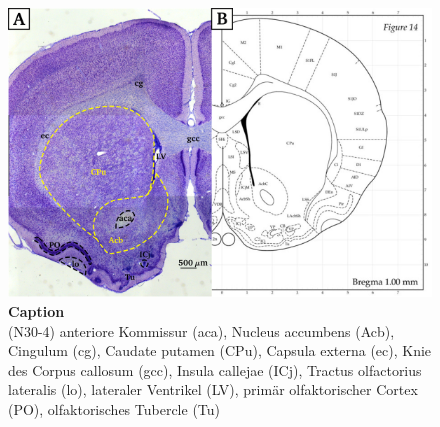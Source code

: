 \documentclass[12pt,a4paper,pdftex]{article}
\begin{document}
\begin{figure}[H]
    \centering
    \includegraphics{pictures/Basalganglia/Nucleus_acumbens.png}
    \caption[Caption]{\textbf{Caption}\\
    (N30-4)
    anteriore Kommissur (aca), Nucleus accumbens (Acb), Cingulum (cg), Caudate putamen (CPu), Capsula externa (ec), Knie des Corpus callosum (gcc), Insula callejae (ICj), Tractus olfactorius lateralis (lo), lateraler Ventrikel (LV), primär olfaktorischer Cortex (PO), olfaktorisches Tubercle (Tu)}
    \label{fig:Nucleus_accumbens}
\end{figure}
\end{document}
